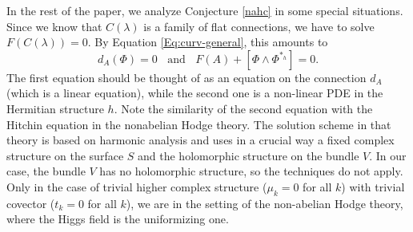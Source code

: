 \documentclass[11pt]{amsart}
\numberwithin{thm}{section} %
\numberwithin{equation}{section} %
\numberwithin{figure}{section} %
\newcommand*{\R}{\mathbb{R}}
\renewcommand*{\S}{S}
\renewcommand*{\l}{\lambda}
\DeclareMathOperator{\SL}{SL}
\begin{document}




In the rest of the paper, we analyze Conjecture \ref{nahc} in some special situations. Since we know that $C(\l)$ is a family of flat connections, we have to solve $F(C(\l))=0$. By Equation \eqref{Eq:curv-general}, this amounts to
\begin{equation}\label{Eq:flatness.2}
d_A(\Phi)=0\;\; \text{ and } \;\; F(A)+[\Phi\wedge\Phi^{*_h}]=0.
\end{equation}
The first equation should be thought of as an equation on the connection $d_A$ (which is a linear equation), while the second one is a non-linear PDE in the Hermitian structure $h$. Note the similarity of the second equation with the Hitchin equation in the nonabelian Hodge theory. The solution scheme in that theory is based on harmonic analysis \cite{Corlette, Simpson} and uses in a crucial way a fixed complex structure on the surface $S$ and the holomorphic structure on the bundle $V$. In our case, the bundle $V$ has no holomorphic structure, so the techniques do not apply. Only in the case of trivial higher complex structure ($\mu_k=0$ for all $k$) with trivial covector ($t_k=0$ for all $k$), we are in the setting of the non-abelian Hodge theory, where the Higgs field is the uniformizing one.
\end{document}
